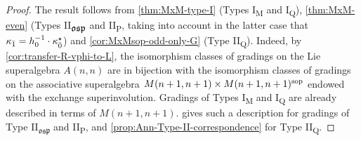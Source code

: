 \begin{proof}%
    The result follows from \cref{thm:MxM-type-I} (Types I\textsubscript{M} and I\textsubscript{Q}), \cref{thm:MxM-even} (Types II\textsubscript{$\mathfrak{osp}$} and II\textsubscript{P}, taking into account in the latter case that $\kappa_{\bar{1}} = h_0^{-1} \cdot \kappa_{\bar{0}}^\star$) 
    and \cref{cor:MxMsop-odd-only-G} (Type II\textsubscript{Q}). 
    Indeed, by \cref{cor:transfer-R-vphi-to-L}, the isomorphism classes of gradings on the Lie superalgebra $A(n,n)$ are in bijection with the isomorphism classes of gradings on the associative superalgebra $M(n+1, n+1) \times M(n+1, n+1)^{\mathrm{sop}}$  endowed with the exchange superinvolution. 
    Gradings of Types I\textsubscript{M} and I\textsubscript{Q} are already described in terms of $M(n+1, n+1)$. 
     gives such a description for gradings of Type II\textsubscript{$\mathfrak{osp}$} and II\textsubscript{P}, and \cref{prop:Ann-Type-II-correspondence} for Type II\textsubscript{Q}. 
\end{proof}
